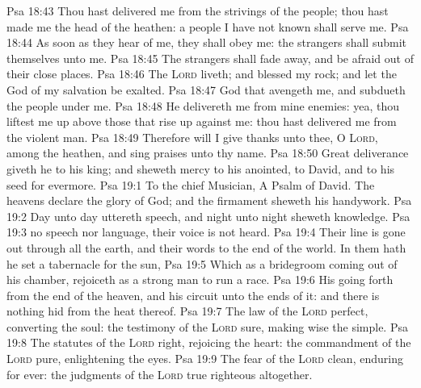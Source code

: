 \vs Psa 18:43 Thou hast delivered me from the strivings of the people;  thou hast made me the head of the heathen: a people  I have not known shall serve me.
\vs Psa 18:44 As soon as they hear of me, they shall obey me: the strangers shall submit themselves unto me.
\vs Psa 18:45 The strangers shall fade away, and be afraid out of their close places.
\vs Psa 18:46 The \textsc{Lord} liveth; and blessed  my rock; and let the God of my salvation be exalted.
\vs Psa 18:47  God that avengeth me, and subdueth the people under me.
\vs Psa 18:48 He delivereth me from mine enemies: yea, thou liftest me up above those that rise up against me: thou hast delivered me from the violent man.
\vs Psa 18:49 Therefore will I give thanks unto thee, O \textsc{Lord}, among the heathen, and sing praises unto thy name.
\vs Psa 18:50 Great deliverance giveth he to his king; and sheweth mercy to his anointed, to David, and to his seed for evermore.
\vs Psa 19:1 To the chief Musician, A Psalm of David. The heavens declare the glory of God; and the firmament sheweth his handywork.
\vs Psa 19:2 Day unto day uttereth speech, and night unto night sheweth knowledge.
\vs Psa 19:3  no speech nor language,  their voice is not heard.
\vs Psa 19:4 Their line is gone out through all the earth, and their words to the end of the world. In them hath he set a tabernacle for the sun,
\vs Psa 19:5 Which  as a bridegroom coming out of his chamber,  rejoiceth as a strong man to run a race.
\vs Psa 19:6 His going forth  from the end of the heaven, and his circuit unto the ends of it: and there is nothing hid from the heat thereof.
\vs Psa 19:7 The law of the \textsc{Lord}  perfect, converting the soul: the testimony of the \textsc{Lord}  sure, making wise the simple.
\vs Psa 19:8 The statutes of the \textsc{Lord}  right, rejoicing the heart: the commandment of the \textsc{Lord}  pure, enlightening the eyes.
\vs Psa 19:9 The fear of the \textsc{Lord}  clean, enduring for ever: the judgments of the \textsc{Lord}  true  righteous altogether.
